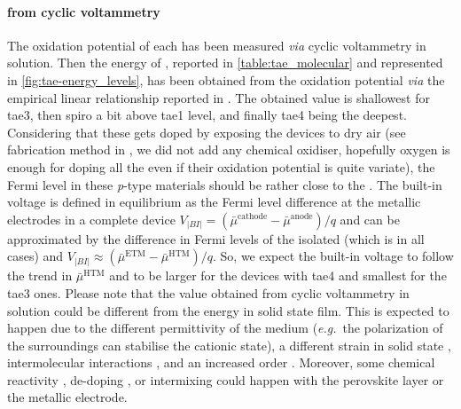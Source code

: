 	\paragraph{ from cyclic voltammetry}
	The oxidation potential of each  has been measured \textsl{via} cyclic voltammetry in solution.
	Then the energy of , reported in \cref{table:tae_molecular} and represented in \cref{fig:tae-energy_levels}, has been obtained from the oxidation potential \textsl{via} the empirical linear relationship reported in .
	The obtained  value is shallowest for \gls{tae3}, then \gls{spiro} a bit above \gls{tae1} level, and finally \gls{tae4} being the deepest.
	Considering that these  gets doped by exposing the devices to dry air (see fabrication method in , we did not add any chemical oxidiser, hopefully oxygen is enough for doping all the  even if their oxidation potential is quite variate), the Fermi level in these \textit{p}-type materials should be rather close to the .
	The built-in voltage is defined in equilibrium as the Fermi level difference at the metallic electrodes in a complete device $V_|BI| = (\bar\mu^{\mathrm{cathode}} - \bar\mu^{\mathrm{anode}})/q$ and can be approximated by the difference in Fermi levels of the isolated  (which is  in all cases) and  $V_|BI| \approx (\bar\mu^{\mathrm{ETM}} - \bar\mu^{\mathrm{HTM}})/q$.
	So, we expect the built-in voltage to follow the trend in $\bar\mu^{\mathrm{HTM}}$ and to be larger for the devices with \gls{tae4} and smallest for the \gls{tae3} ones.
	Please note that the value obtained from cyclic voltammetry in solution could be different from the  energy in solid state film.
	This is expected to happen due to the different permittivity of the medium (\textsl{e.g.}\ the polarization of the surroundings can stabilise the cationic state), a different strain in solid state \cite{Wei2012a}, intermolecular interactions \cite{Kashimoto2018}, and an increased order \cite{Shao2016}.
	Moreover, some chemical reactivity \cite{Carrillo2016,Kim2016a}, de-doping \cite{Kim2017}, or intermixing \cite{Domanski2016} could happen with the perovskite layer or the metallic electrode.

